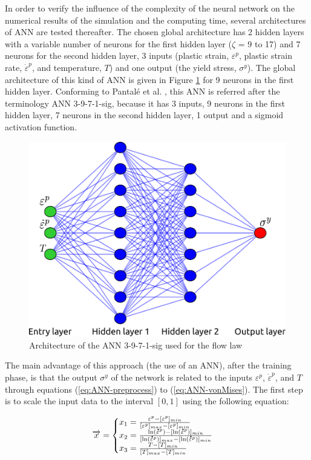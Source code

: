 \documentclass[final,5p,times,twocolumn]{elsarticle}
\newcommand{\mdot}[1]{\accentset{\mbox{\bfseries .}}{#1}}
\begin{document}
In order to verify the influence of the complexity of the neural network on the numerical results of the simulation and the computing time, several architectures of ANN are tested thereafter. The chosen global architecture has 2 hidden layers with a variable number of neurons for the first hidden layer ($\zeta$ = 9 to 17) and 7 neurons for the second hidden layer, 3 inputs (plastic strain, $\varepsilon^p$, plastic strain rate, ${\dot{\varepsilon}}^p$, and temperature, $T$) and one output (the yield stress, $\sigma^y$). The global architecture of this kind of ANN is given in Figure \ref{ANN} for 9 neurons in the first hidden layer. Conforming to Pantalé et al. \cite{pantale_efficient_2022}, this ANN is referred after the terminology ANN 3-9-7-1-sig, because it has 3 inputs, 9 neurons in the first hidden layer, 7 neurons in the second hidden layer, 1 output and a sigmoid activation function.

\begin{figure}[h]
\centering
\includegraphics[width=0.8\columnwidth]{Figures/ANN}
\caption{Architecture of the ANN 3-9-7-1-sig used for the flow law}
\label{ANN}
\end{figure}

The main advantage of this approach (the use of an ANN), after the training phase, is that the output $\sigma^y$ of the network is related to the inputs $\varepsilon^p$, ${\dot{\varepsilon}}^p$, and $T$ through equations (\ref{eq:ANN-preprocess}) to (\ref{eq:ANN-vonMises}). The first step is to scale the input data to the interval $[0,1]$ using the following equation:

\begin{equation}
\overrightarrow{x} =
\begin{cases}
x_1 = \frac{\varepsilon^p - [\varepsilon^p]_{min}}{[\varepsilon^p]_{max} - [\varepsilon^p]_{min}}\\
x_2 = \frac{\ln(\mdot{\varepsilon}^p)-[\ln(\mdot{\varepsilon}^p)]_{min}}{[\ln(\mdot{\varepsilon}^p)]_{max}-[\ln(\mdot{\varepsilon}^p)]_{min}}\label{eq:ANN-preprocess}\\
x_3 = \frac{T-[T]_{min}}{[T]_{max}-[T]_{min}}
\end{cases}
\end{equation}
\end{document}
